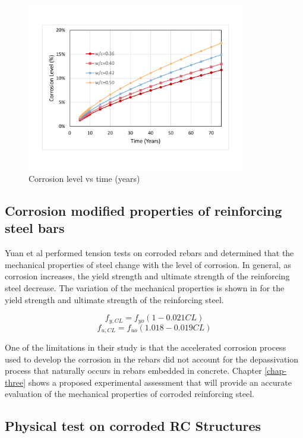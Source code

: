 \begin{figure}[htbp]
\centering
\includegraphics[width=0.85\textwidth]{Chapter-2/figs/CorrosionLevel}
\caption{Corrosion level vs time (years)}
\label{fig:CorrosionLevel_Time}
\end{figure}

\subsection{Corrosion modified properties of reinforcing steel bars}

Yuan et al \cite{Yuan2017a} performed tension tests on corroded rebars and determined that the mechanical properties of steel change with the level of corrosion. In general, as corrosion increases, the yield strength and ultimate strength of the reinforcing steel decrease.  The variation of the mechanical properties is shown in  for the yield strength and ultimate strength of the reinforcing steel.

\begin{equation}
  f_{y,CL}=f_{yo}(1-0.021CL)
  \label{eq.eleven}
\end{equation} 
\[
  f_{u,CL}=f_{uo}(1.018-0.019CL)
\]

One of the limitations in their study is that the accelerated corrosion process used to develop the corrosion in the rebars did not account for the depassivation process that naturally occurs in rebars embedded in concrete. Chapter \ref{chap-three} shows a proposed experimental assessment that will provide an accurate evaluation of the mechanical properties of corroded reinforcing steel. 

\subsection{Physical test on corroded RC Structures}

